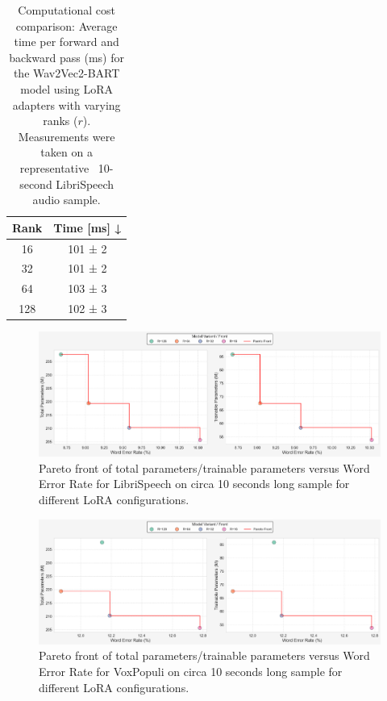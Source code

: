 \begin{table}[h]
    \centering
    \begin{tabular}{@{}cc@{}}
    \toprule
        Rank &  Time [ms] ↓   \\
         \midrule
         16 & 101 ± 2 \\
         32 & 101 ± 2 \\
         64 & 103 ± 3 \\
         128 & 102 ± 3 \\
    \bottomrule
    \end{tabular}
    \caption{Computational cost comparison: Average time per forward and backward pass (ms) for the Wav2Vec2-BART model using LoRA adapters with varying ranks (\( r \)). Measurements were taken on a representative ~10-second LibriSpeech audio sample.}
    \label{tab:loras_time}
\end{table}

\begin{figure}[h!]
    \centering
    \includegraphics[width=1\textwidth]{obrazky-figures/plots/libri_lora.png}
    \caption{Pareto front of total parameters/trainable parameters versus Word Error Rate for LibriSpeech on circa 10 seconds long sample for different LoRA configurations.}
    \label{fig:pareto-front-librispeech_lora}
\end{figure}

\begin{figure}[h!]
    \centering
    \includegraphics[width=1\textwidth]{obrazky-figures/plots/vox_lora.png}
    \caption{Pareto front of total parameters/trainable parameters versus Word Error Rate for VoxPopuli on circa 10 seconds long sample for different LoRA configurations.}
    \label{fig:pareto-front-voxpopuli_lora}
\end{figure}


